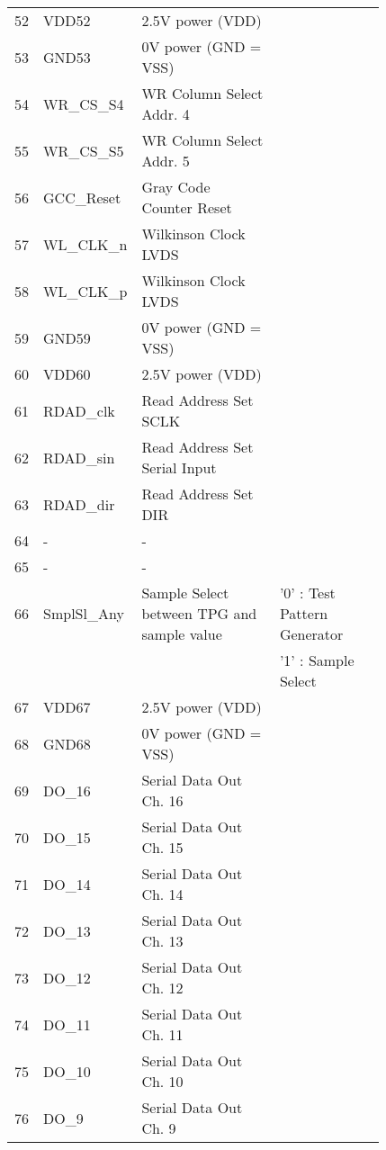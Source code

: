 \begin{footnotesize}
\begin{center}
\begin{longtabu}{  | c | p{0.12\linewidth} | p{0.4\linewidth} | p{0.3\linewidth} |}
 52	& VDD52		& 2.5V power (VDD)	& \\
 53	& GND53		& 0V power (GND = VSS)	& \\
 54	& WR\_CS\_S4	& WR Column Select Addr. 4	& \\
 55	& WR\_CS\_S5	& WR Column Select Addr. 5	& \\
 56	& GCC\_Reset & Gray Code Counter Reset	& \\
 57	& WL\_CLK\_n	& Wilkinson Clock LVDS	& \\
 58	& WL\_CLK\_p	& Wilkinson Clock LVDS	& \\
 59	& GND59		& 0V power (GND = VSS)	& \\
 60	& VDD60		& 2.5V power (VDD)	& \\
 61	& RDAD\_clk	& Read Address Set SCLK	& \\
 62	& RDAD\_sin	& Read Address Set Serial Input	& \\
 63	& RDAD\_dir	& Read Address Set DIR	& \\
64	& -			& - & \\
65	& -			& -	& \\ \hline
{} 66	& SmplSl\_Any & Sample Select between TPG and sample value	& '0' : Test Pattern Generator\\
	&			&					& '1' : Sample Select\\ \hline
{} 67	& VDD67		& 2.5V power (VDD)	& \\
 68	& GND68		& 0V power (GND = VSS)	& \\
 69	& DO\_16	& Serial Data Out Ch. 16	& \\
 70	& DO\_15	& Serial Data Out Ch. 15	& \\
 71	& DO\_14	& Serial Data Out Ch. 14	& \\
 72	& DO\_13	& Serial Data Out Ch. 13	& \\
 73	& DO\_12	& Serial Data Out Ch. 12	& \\
 74	& DO\_11	& Serial Data Out Ch. 11	& \\
 75	& DO\_10	& Serial Data Out Ch. 10	& \\
 76	& DO\_9		& Serial Data Out Ch. 9	& \\

\end{longtabu}
\end{center}
\end{footnotesize}
